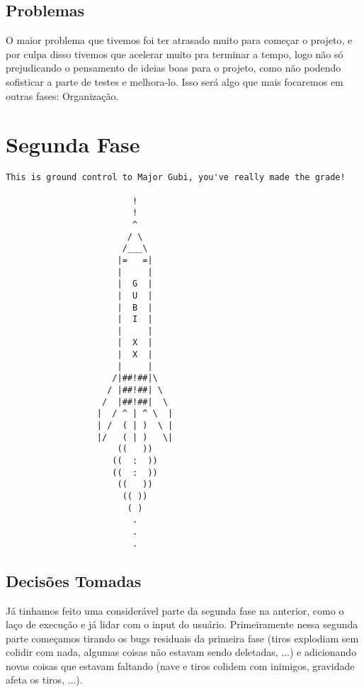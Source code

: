 \documentclass[12pt,a4paper]{article}
\begin{document}
    		\subsection{Problemas}
    		O maior problema que tivemos foi ter atrasado muito para começar o projeto, e por culpa disso
		tivemos que acelerar muito pra terminar a tempo, logo não só prejudicando o pensamento de ideias
		boas para o projeto, como não podendo sofisticar a parte de testes e melhora-lo. Isso será algo
		que mais focaremos em outras fases: Organização.
	
	\newpage
	\section{Segunda Fase}
	\begin{verbatim}
This is ground control to Major Gubi, you've really made the grade!

                         !
                         !
                         ^
                        / \
                       /___\
                      |=   =|
                      |     |
                      |  G  |
                      |  U  |
                      |  B  |
                      |  I  |
                      |     |
                      |  X  |
                      |  X  |
                      |     |
                     /|##!##|\
                    / |##!##| \
                   /  |##!##|  \
                  |  / ^ | ^ \  |
                  | /  ( | )  \ |
                  |/   ( | )   \|
                      ((   ))
                     ((  :  ))
                     ((  :  ))
                      ((   ))
                       (( ))
                        ( )
                         .
                         .
                         .
	\end{verbatim}
		\subsection{Decisões Tomadas}
		Já tinhamos feito uma considerável parte da segunda fase na anterior, como o laço de execução e
		já lidar com o input do usuário. Primeiramente nessa segunda parte começamos tirando os bugs residuais
		da primeira fase (tiros explodiam sem colidir com nada, algumas coisas não estavam sendo deletadas, ...) 
		e adicionando novas coisas que estavam faltando (nave e tiros colidem com inimigos, gravidade afeta os
		tiros, ...).\\
		
\end{document}

